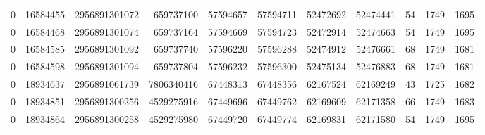 \begin{tabular}{rrrrrrrrrrr}
0 & 16584455 & 2956891301072 & 659737100 & 57594657 & 57594711 & 52472692 & 52474441 & 54 & 1749 & 1695 \\
0 & 16584468 & 2956891301074 & 659737164 & 57594669 & 57594723 & 52472914 & 52474663 & 54 & 1749 & 1695 \\
0 & 16584585 & 2956891301092 & 659737740 & 57596220 & 57596288 & 52474912 & 52476661 & 68 & 1749 & 1681 \\
0 & 16584598 & 2956891301094 & 659737804 & 57596232 & 57596300 & 52475134 & 52476883 & 68 & 1749 & 1681 \\
0 & 18934637 & 2956891061739 & 7806340416 & 67448313 & 67448356 & 62167524 & 62169249 & 43 & 1725 & 1682 \\
0 & 18934851 & 2956891300256 & 4529275916 & 67449696 & 67449762 & 62169609 & 62171358 & 66 & 1749 & 1683 \\
0 & 18934864 & 2956891300258 & 4529275980 & 67449720 & 67449774 & 62169831 & 62171580 & 54 & 1749 & 1695 \\
\bottomrule
\end{tabular}
